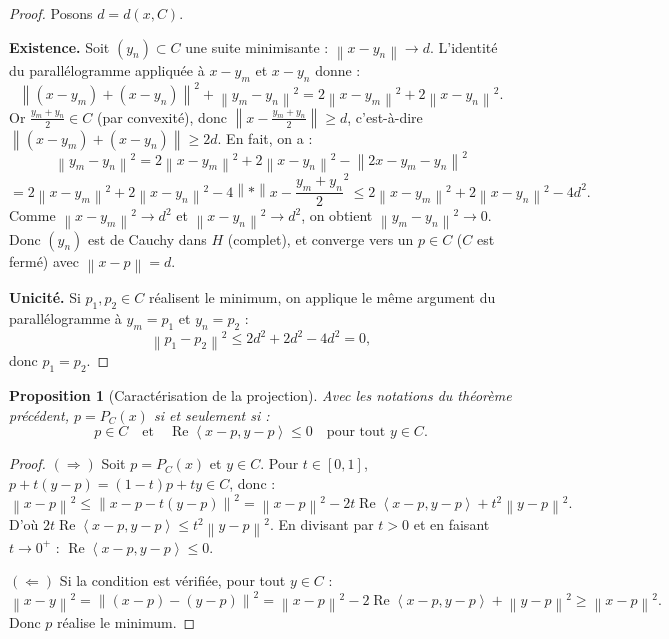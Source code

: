 \documentclass[a4paper,12pt]{book}
\newcommand{\norm}[1]{\left\| #1 \right\|}
\newcommand{\inner}[2]{\left\langle #1, #2 \right\rangle}
\theoremstyle{definition}
\theoremstyle{plain}
\newtheorem{proposition}[definition]{Proposition}
\theoremstyle{remark}
\begin{document}
\begin{proof}
Posons $d = d(x, C)$.

\textbf{Existence.} Soit $(y_n) \subset C$ une suite minimisante : $\norm{x - y_n} \to d$. L'identité du parallélogramme appliquée à $x - y_m$ et $x - y_n$ donne :
\[
    \norm{(x - y_m) + (x - y_n)}^2 + \norm{y_m - y_n}^2 = 2\norm{x - y_m}^2 + 2\norm{x - y_n}^2.
\]
Or $\frac{y_m + y_n}{2} \in C$ (par convexité), donc $\norm{x - \frac{y_m + y_n}{2}} \geq d$, c'est-à-dire $\norm{(x-y_m) + (x-y_n)} \geq 2d$. En fait, on a :
\[
    \norm{y_m - y_n}^2 = 2\norm{x - y_m}^2 + 2\norm{x - y_n}^2 - \norm{2x - y_m - y_n}^2
\]
\[
    = 2\norm{x - y_m}^2 + 2\norm{x - y_n}^2 - 4\norm*{x - \frac{y_m+y_n}{2}}^2 \leq 2\norm{x - y_m}^2 + 2\norm{x - y_n}^2 - 4d^2.
\]
Comme $\norm{x - y_m}^2 \to d^2$ et $\norm{x - y_n}^2 \to d^2$, on obtient $\norm{y_m - y_n}^2 \to 0$. Donc $(y_n)$ est de Cauchy dans $H$ (complet), et converge vers un $p \in C$ ($C$ est fermé) avec $\norm{x - p} = d$.

\textbf{Unicité.} Si $p_1, p_2 \in C$ réalisent le minimum, on applique le même argument du parallélogramme à $y_m = p_1$ et $y_n = p_2$ :
\[
    \norm{p_1 - p_2}^2 \leq 2d^2 + 2d^2 - 4d^2 = 0,
\]
donc $p_1 = p_2$.
\end{proof}

\begin{proposition}[Caractérisation de la projection]\label{prop:caract-projection}
Avec les notations du théorème précédent, $p = P_C(x)$ si et seulement si :
\[
    p \in C \quad \text{et} \quad \operatorname{Re}\inner{x - p}{y - p} \leq 0 \quad \text{pour tout } y \in C.
\]
\end{proposition}

\begin{proof}
$(\Rightarrow)$ Soit $p = P_C(x)$ et $y \in C$. Pour $t \in [0,1]$, $p + t(y-p) = (1-t)p + ty \in C$, donc :
\[
    \norm{x - p}^2 \leq \norm{x - p - t(y-p)}^2 = \norm{x-p}^2 - 2t\operatorname{Re}\inner{x-p}{y-p} + t^2\norm{y-p}^2.
\]
D'où $2t\operatorname{Re}\inner{x-p}{y-p} \leq t^2\norm{y-p}^2$. En divisant par $t > 0$ et en faisant $t \to 0^+$ : $\operatorname{Re}\inner{x-p}{y-p} \leq 0$.

$(\Leftarrow)$ Si la condition est vérifiée, pour tout $y \in C$ :
\[
    \norm{x - y}^2 = \norm{(x-p) - (y-p)}^2 = \norm{x-p}^2 - 2\operatorname{Re}\inner{x-p}{y-p} + \norm{y-p}^2 \geq \norm{x-p}^2.
\]
Donc $p$ réalise le minimum.
\end{proof}
\end{document}
